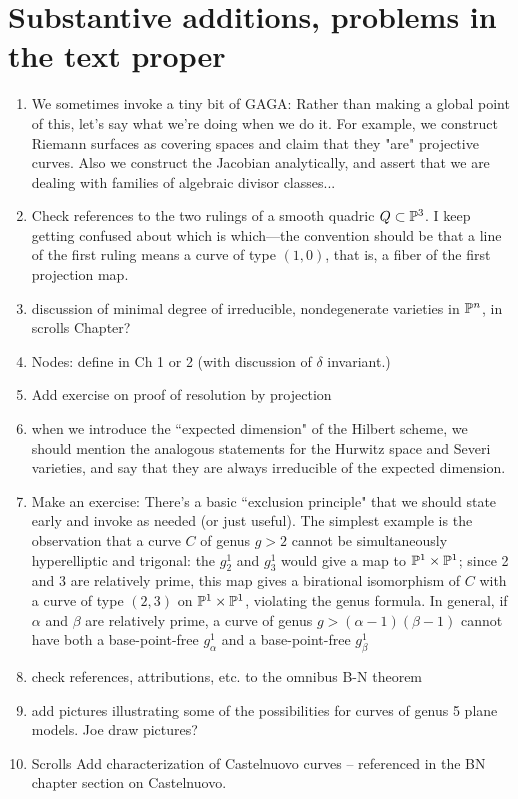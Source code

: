 \documentclass[12pt, leqno]{book}
\begin{document}
\section{Substantive additions, problems in the text proper}


\begin{enumerate}
 
 \item We sometimes invoke a tiny bit of GAGA: Rather than making a global point of this, let's say what we're doing when we do it. For example, we construct Riemann surfaces
 as covering spaces and claim that they "are" projective curves. Also we construct the Jacobian analytically, and assert that
 we are dealing with families of algebraic divisor classes...
 
\item Check references to the two rulings of a smooth quadric $Q \subset \PP^3$. I keep getting confused about which is which---the convention should be that a line of the first ruling means a curve of type $(1,0)$, that is, a fiber of the first projection map.

\item discussion of minimal degree of irreducible, nondegenerate varieties in $\PP^n$, in scrolls Chapter?

\item Nodes: define in Ch 1 or 2 (with discussion of $\delta$ invariant.)

\item Add exercise on proof of resolution by projection 

\item when we introduce the ``expected dimension" of the Hilbert scheme, we should mention the analogous statements for the Hurwitz space and Severi varieties, and say that they are always irreducible of the expected dimension.


\item Make an exercise: There's a basic ``exclusion principle" that we should state early and invoke as needed (or just useful). The simplest example is the observation that a curve $C$ of genus $g > 2$ cannot be simultaneously hyperelliptic and trigonal: the $g^1_2$ and $g^1_3$ would give a map to $\PP^1 \times \PP^1$; since 2 and 3 are relatively prime, this map gives a birational isomorphism of $C$ with a curve of type $(2,3)$ on $\PP^1 \times \PP^1$, violating the genus formula. In general, if $\alpha$ and $\beta$ are relatively prime, a curve of genus $g > (\alpha - 1)(\beta - 1)$ cannot have both a base-point-free $g^1_\alpha$ and a base-point-free $g^1_\beta$


\item {check references, attributions, etc.} to the omnibus B-N theorem


\item add pictures illustrating some of the possibilities for curves of genus 5  plane models. Joe draw pictures?

\item{Scrolls}
Add characterization of Castelnuovo curves -- referenced in the BN chapter section on Castelnuovo.


\end{enumerate}
\end{document}
